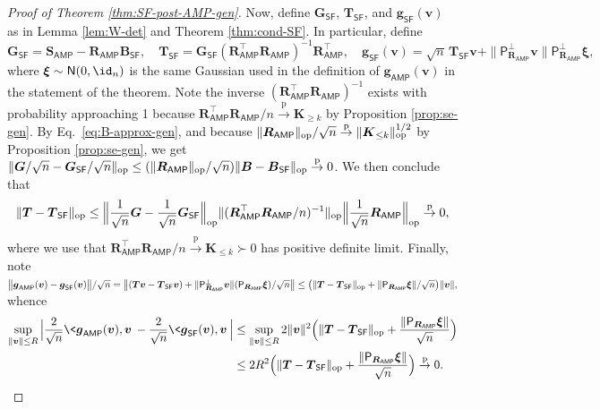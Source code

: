 \documentclass[]{article}
\def\op{{\rm op}}
\def\bR{{\boldsymbol R}}
\def\normal{{\sf N}}
\def\bv{{\boldsymbol V}}
\def\bT{\boldsymbol{T}}
\def\bS{\boldsymbol{S}}
\def\proj{{\mathsf P}}
\def\bB{{\boldsymbol B}}
\def\bg{{\boldsymbol g}}
\def\bv{{\boldsymbol v}}
\def\bxi{{\boldsymbol \xi}}
\def\bG{{\boldsymbol G}}
\def\bv{{\boldsymbol v}}
\def\proj{{\mathsf P}}
\def\normal{{\sf N}}
\def\bg{{\boldsymbol g}}
\def\bK{\boldsymbol{K}}
\def\pconv{\stackrel{\mathrm{p}}\rightarrow}
\def\AMP{\mathsf{AMP}}
\def\SF{\mathsf{SF}}
\begin{document}
\begin{proof}[Proof of Theorem \ref{thm:SF-post-AMP-gen}]
    Now,
    define $\bG_{\SF}$, $\bT_{\SF}$, and $\bg_{\SF}(\bv)$ 
    as in Lemma \ref{lem:W-det} and Theorem \ref{thm:cond-SF}.
    In particular, 
    define
    \begin{equation}
    \label{eq:def-gamp}
        \bG_{\SF} = \bS_{\AMP} - \bR_{\AMP} \bB_{\SF},
        \quad 
        \bT_{\SF} = \bG_{\SF}(\bR_{\AMP}^\top \bR_{\AMP})^{-1} \bR_{\AMP}^\top,
        \quad 
        \bg_{\SF}(\bv) = \sqrt{n}\, \bT_{\SF} \bv + \| \proj_{\bR_{\AMP}}^\perp \bv \| \proj_{\bR_{\AMP}}^\perp \bxi,
    \end{equation}
    where $\bxi \sim \normal(0,\id_n)$ is the same Gaussian used in the definition of $\bg_{\AMP}(\bv)$ in the statement of the theorem.
    Note the inverse $(\bR_{\AMP}^\top \bR_{\AMP})^{-1}$ exists with probability approaching 1 because $\bR_{\AMP}^\top \bR_{\AMP} / n \pconv \bK_{\geq k}$ by Proposition \ref{prop:se-gen}.
    By Eq.~\eqref{eq:B-approx-gen},
    and because  $\| \bR_{\AMP} \|_{\op}/\sqrt{n} \pconv \| \bK_{\leq k} \|_{\op}^{1/2}$ by Proposition \ref{prop:se-gen},
    we get 
    $\| \bG/\sqrt{n} - \bG_{\SF}/\sqrt{n} \|_{\op} \leq (\| \bR_{\AMP} \|_{\op}/\sqrt{n}) \| \bB - \bB_{\SF} \|_{\op} \pconv 0$.
    We then conclude that
    \begin{equation}
        \| \bT - \bT_{\SF} \|_{\op}  
            \leq 
            \Big\|
                \frac1{\sqrt{n}} \bG - \frac1{\sqrt{n}}\bG_{\SF}
            \Big\|_{\op}
            \| (\bR_{\AMP}^\top \bR_{\AMP}/n)^{-1} \|_{\op} 
            \Big\| \frac1{\sqrt{n}} \bR_{\AMP} \Big\|_{\op}
            \pconv 0,
    \end{equation}
    where we use that $\bR_{\AMP}^\top \bR_{\AMP}/n \pconv \bK_{\leq k} \succ 0$ has positive definite limit.
    Finally, note 
    $\big\| \bg_{\AMP}(\bv) - \bg_{\SF}(\bv) \big\|/\sqrt{n}
        =
        \big\| (\bT\bv - \bT_{\SF}\bv) + \| \proj_{\bR_{\AMP}}^\perp \bv \| (\proj_{\bR_{\AMP}}\bxi)/\sqrt{n} \big\|
        \leq 
        \big(\| \bT - \bT_{\SF} \|_{\op} + \| \proj_{\bR_{\AMP}} \bxi \|/\sqrt{n}\big) \| \bv \|,$
    whence
    \begin{equation}
    \begin{aligned}
        \sup_{\| \bv \| \leq R}
        \Big|
            \frac2{\sqrt{n}} \< \bg_{\AMP}(\bv) , \bv \>
            -
            \frac2{\sqrt{n}} \< \bg_{\SF} (\bv) , \bv \>
        \Big|
        &\leq \sup_{\| \bv \| \leq R} 2\|\bv\|^2
            \Big( 
                \| \bT - \bT_{\SF} \|_{\op} 
                + 
                \frac{\|\proj_{\bR_{\AMP}}\bxi\|}{\sqrt{n}}
            \Big)
        \\
        &\leq 2R^2\Big(\| \bT - \bT_{\SF} \|_{\op}+\frac{\|\proj_{\bR_{\AMP}}\bxi\|}{\sqrt{n}}\Big)
        \pconv 0.
    \end{aligned}
    \end{equation}
    

\end{proof}
\end{document}

